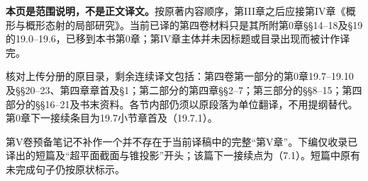 \noindent\textbf{本页是范围说明，不是正文译文。}按原著内容顺序，第III章之后应接第IV章《概形与概形态射的局部研究》。当前已译的第四卷材料只是其所附第0章§§14--18及§19的19.0--19.6，已移到本书第0章；第IV章主体并未因标题或目录出现而被计作译完。

核对上传分册的原目录，剩余连续译文包括：第四卷第一部分的第0章19.7--19.10及§§20--23、第四章章首及§1；第二部分的第四章§§2--7；第三部分的§§8--15；第四部分的§§16--21及书末资料。各节内部仍须以原段落为单位翻译，不用提纲替代。第0章下一接续条目为19.7小节章首及（19.7.1）。

第V卷预备笔记不补作一个并不存在于当前译稿中的完整“第V章”。下编仅收录已译出的短篇及“超平面截面与锥投影”开头；该篇下一接续点为（7.1）。短篇中原有未完成句子仍按原状标示。
